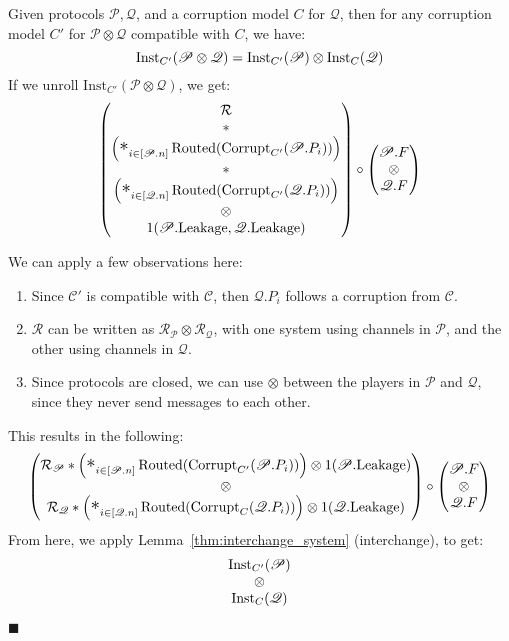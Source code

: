 \begin{theorem}
  \label{thm:concurrent_breakdown}
  Given protocols $\mathscr{P}, \mathscr{Q}$, and a corruption model $C$
  for $\mathscr{Q}$, then for any corruption model $C'$ for $\mathscr{P} \otimes \mathscr{Q}$ compatible with $C$, we have:
  \[
    \text{Inst}_{C'}(\mathscr{P} \otimes \mathscr{Q}) = \text{Inst}_{C'}(\mathscr{P}) \otimes \text{Inst}_C(\mathscr{Q})
  \]
 If we unroll $\text{Inst}_{C'}(\mathscr{P} \otimes \mathscr{Q})$, we get:
$$
\begin{pmatrix}
\mathcal{R}\cr
*\cr
\left(\bigast_{i \in [\mathscr{P}.n]} \tx{Routed}(\tx{Corrupt}_{C'}(\mathscr{P}.P_i))\right)\cr
*\cr
\left(\bigast_{i \in [\mathscr{Q}.n]} \tx{Routed}(\tx{Corrupt}_{C'}(\mathscr{Q}.P_i))\right)\cr
\otimes\cr
1(\mathscr{P}.\tx{Leakage}, \mathscr{Q}.\tx{Leakage})
\end{pmatrix}
\circ
\begin{pmatrix}
\mathscr{P}.F\cr
\otimes\cr
\mathscr{Q}.F\cr
\end{pmatrix}
$$

We can apply a few observations here:
\begin{enumerate}
  \item Since $\mathscr{C}'$ is compatible with $\mathscr{C}$, then $\mathscr{Q}.P_i$ follows a corruption from $\mathscr{C}$.
  \item $\mathcal{R}$ can be written as $\mathcal{R}_\mathscr{P} \otimes \mathcal{R}_\mathscr{Q}$,
  with one system using channels in $\mathscr{P}$, and the other using channels in $\mathscr{Q}$.
  \item Since protocols are closed, we can use $\otimes$ between the players in $\mathscr{P}$ and $\mathscr{Q}$,
  since they never send messages to each other.
\end{enumerate}
This results in the following:
$$
\begin{pmatrix}
  \mathcal{R}_{\mathscr{P}} * \left(\bigast_{i \in [\mathscr{P}.n]} \tx{Routed}(\tx{Corrupt}_{C'}(\mathscr{P}.P_i))\right) \otimes 1(\mathscr{P}.\tx{Leakage})\cr
\otimes\cr
  \mathcal{R}_{\mathscr{Q}} * \left(\bigast_{i \in [\mathscr{Q}.n]} \tx{Routed}(\tx{Corrupt}_{C}(\mathscr{Q}.P_i))\right) \otimes 1(\mathscr{Q}.\tx{Leakage})
\end{pmatrix}
\circ
\begin{pmatrix}
\mathscr{P}.F\cr
\otimes\cr
\mathscr{Q}.F\cr
\end{pmatrix}
$$
From here, we apply Lemma~\ref{thm:interchange_system} (interchange), to get:
$$
\begin{matrix}
\text{Inst}_{C'}(\mathscr{P})\cr
\otimes\cr
\text{Inst}_{C}(\mathscr{Q})\cr
\end{matrix}
$$

$\blacksquare$

\end{theorem}

